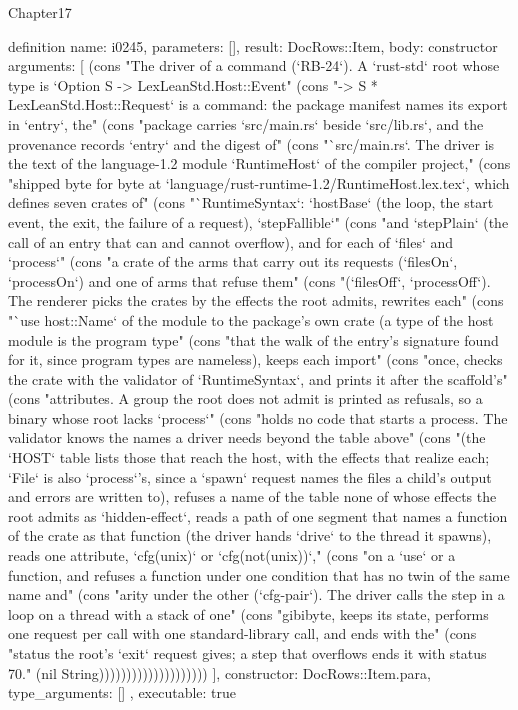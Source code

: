 \begin{lexlean}{Chapter17}
\begin{semanticmodule}
definition{
  name: i0245,
  parameters: [],
  result: DocRows::Item,
  body: constructor{
    arguments: [
      (cons "The driver of a command (`RB-24`). A `rust-std` root whose type is `Option S -> LexLeanStd.Host::Event" (cons "-> S * LexLeanStd.Host::Request` is a command: the package manifest names its export in `entry`, the" (cons "package carries `src/main.rs` beside `src/lib.rs`, and the provenance records `entry` and the digest of" (cons "`src/main.rs`. The driver is the text of the language-1.2 module `RuntimeHost` of the compiler project," (cons "shipped byte for byte at `language/rust-runtime-1.2/RuntimeHost.lex.tex`, which defines seven crates of" (cons "`RuntimeSyntax`: `hostBase` (the loop, the start event, the exit, the failure of a request), `stepFallible`" (cons "and `stepPlain` (the call of an entry that can and cannot overflow), and for each of `files` and `process`" (cons "a crate of the arms that carry out its requests (`filesOn`, `processOn`) and one of arms that refuse them" (cons "(`filesOff`, `processOff`). The renderer picks the crates by the effects the root admits, rewrites each" (cons "`use host::Name` of the module to the package's own crate (a type of the host module is the program type" (cons "that the walk of the entry's signature found for it, since program types are nameless), keeps each import" (cons "once, checks the crate with the validator of `RuntimeSyntax`, and prints it after the scaffold's" (cons "attributes. A group the root does not admit is printed as refusals, so a binary whose root lacks `process`" (cons "holds no code that starts a process. The validator knows the names a driver needs beyond the table above" (cons "(the `HOST` table lists those that reach the host, with the effects that realize each; `File` is also `process`'s, since a `spawn` request names the files a child's output and errors are written to), refuses a name of the table none of whose effects the root admits as `hidden-effect`, reads a path of one segment that names a function of the crate as that function (the driver hands `drive` to the thread it spawns), reads one attribute, `cfg(unix)` or `cfg(not(unix))`," (cons "on a `use` or a function, and refuses a function under one condition that has no twin of the same name and" (cons "arity under the other (`cfg-pair`). The driver calls the step in a loop on a thread with a stack of one" (cons "gibibyte, keeps its state, performs one request per call with one standard-library call, and ends with the" (cons "status the root's `exit` request gives; a step that overflows ends it with status 70." (nil String))))))))))))))))))))
    ],
    constructor: DocRows::Item.para,
    type_arguments: []
  },
  executable: true
}


\end{semanticmodule}
\end{lexlean}
